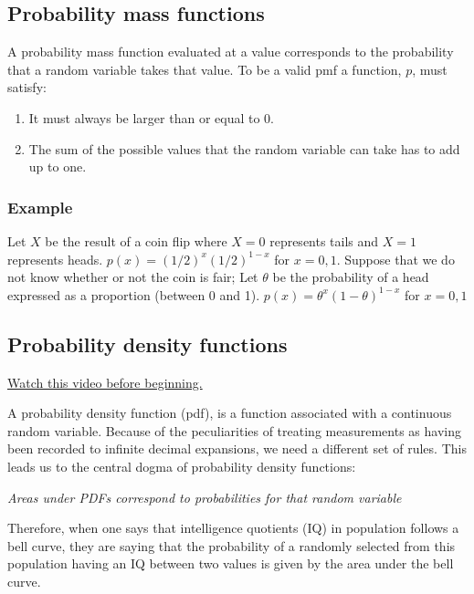 \documentclass[]{article}
\begin{document}
\subsection{Probability mass
functions}\label{probability-mass-functions}

A probability mass function evaluated at a value corresponds to the
probability that a random variable takes that value. To be a valid pmf a
function, $p$, must satisfy:

\begin{enumerate}
\def\labelenumi{\arabic{enumi}.}
\itemsep1pt\parskip0pt
\item
  It must always be larger than or equal to 0.
\item
  The sum of the possible values that the random variable can take has
  to add up to one.
\end{enumerate}

\subsubsection{Example}\label{example}

Let $X$ be the result of a coin flip where $X=0$ represents tails and
$X = 1$ represents heads. $p(x) = (1/2)^{x} (1/2)^{1-x}$ for $x = 0,1$.
Suppose that we do not know whether or not the coin is fair; Let
$\theta$ be the probability of a head expressed as a proportion (between
0 and 1). $p(x) = \theta^{x} (1 - \theta)^{1-x}$ for $x = 0,1$

\subsection{Probability density
functions}\label{probability-density-functions}

\href{http://youtu.be/mPe0Us4VYDM?list=PLpl-gQkQivXiBmGyzLrUjzsblmQsLtkzJ}{Watch
this video before beginning.}

A probability density function (pdf), is a function associated with a
continuous random variable. Because of the peculiarities of treating
measurements as having been recorded to infinite decimal expansions, we
need a different set of rules. This leads us to the central dogma of
probability density functions:

\emph{Areas under PDFs correspond to probabilities for that random
variable}

Therefore, when one says that intelligence quotients (IQ) in population
follows a bell curve, they are saying that the probability of a randomly
selected from this population having an IQ between two values is given
by the area under the bell curve.
\end{document}
